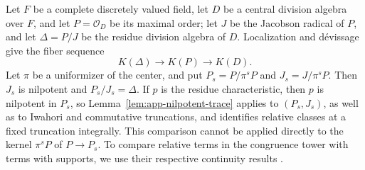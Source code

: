Let $F$ be a complete discretely valued field, let $D$ be a central division algebra over $F$, and let $P=\mathcal O_D$ be its maximal order; let $J$ be the Jacobson radical of $P$, and let $\Delta=P/J$ be the residue division algebra of $D$.
Localization and d\'evissage give the fiber sequence
\[
 K(\Delta)\longrightarrow K(P)\longrightarrow K(D).
\]
Let $\pi$ be a uniformizer of the center, and put $P_s=P/\pi^sP$ and $J_s=J/\pi^sP$.
Then $J_s$ is nilpotent and $P_s/J_s=\Delta$.
If $p$ is the residue characteristic, then $p$ is nilpotent in $P_s$, so Lemma~\ref{lem:app-nilpotent-trace} applies to $(P_s,J_s)$, as well as to Iwahori and commutative truncations, and identifies relative classes at a fixed truncation integrally.
This comparison cannot be applied directly to the kernel $\pi^sP$ of $P\to P_s$.
To compare relative terms in the congruence tower with terms with supports, we use their respective continuity results \cite{DundasGoodwillieMcCarthy,GeisserHesselholtNilpotent,DundasMorrow,ClausenMathewMorrow}.


